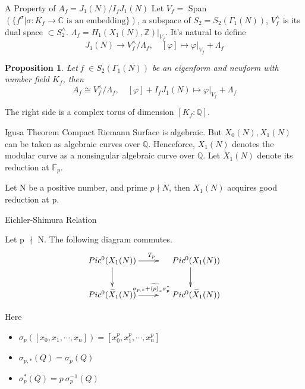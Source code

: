 \documentclass{beamer}
\theoremstyle{plain}
\newtheorem{proposition}{Proposition}[section]
\theoremstyle{definition}
\theoremstyle{remark}
\newcommand{\Q}{\mathbb{Q}}
\newcommand{\Z}{\mathbb{Z}}
\begin{document}
\begin{frame}{A Property of $A_f=J_1(N)/I_fJ_1(N)$}
    Let $V_f= $ Span $(\{f^{\sigma}|\sigma: K_f \to \mathbb{C} \text{ is an embedding}\})$, a subspace of $S_2=S_2(\Gamma_1(N))$,
    $V_f^{\wedge}$ is its dual space $\subset S_2^{\wedge}$. $\Lambda_f=H_1(X_1(N),\Z)|_{V_f}$. It's natural to define
    \[J_1(N) \to V_f^{\wedge}/\Lambda_f, \quad [\varphi] \mapsto \varphi|_{V_f} +\Lambda_f \]
    \pause
    \begin{proposition}
        Let f $\in S_2(\Gamma_1(N))$ be an eigenform and newform with number field $K_f$, then
        \[A_f \cong V_f^{\wedge}/\Lambda_f, \quad [\varphi] + I_fJ_1(N) \mapsto \varphi|_{V_f} +\Lambda_f\]
    \end{proposition}
    The right side is a complex torus of dimension $[K_f:\Q]$.
\end{frame}

\begin{frame}{Igusa Theorem}
    Compact Riemann Surface is algebraic. But $X_0(N),X_1(N)$ can be taken as algebraic curves over $\Q$.
    \vskip 0.2cm
    Henceforce, $X_1(N)$ denotes the modular curve as a nonsingular algebraic curve over $\Q$.
    Let $\widetilde{X}_1(N)$ denote its reduction at $\mathbb{F}_p$.
    \begin{theorem}
        Let N be a positive number, and prime $p \nmid N$, then
        $X_1(N)$ acquires good reduction at p.
    \end{theorem}

\end{frame}

\begin{frame}{Eichler-Shimura Relation}
    \begin{theorem}
        Let p $\nmid $ N. The following diagram commutes.
        \[\xymatrix{\ar @{} [dr] |{}
            Pic^0(X_1(N)) \ar[d] \ar[r]^{T_p} & \quad \ Pic^0(X_1(N)) \ar[d] \\
            Pic^0(\widetilde{X}_1(N)) \ar[r]^{\sigma_{p,*}+\widetilde{\langle p \rangle}_*\sigma^*_p} & \quad  \ Pic^0(\widetilde{X}_1(N)) } \]
    \end{theorem}
    Here
    \begin{itemize}
        \item $\sigma_p([x_0,x_1,\cdots,x_n])=[x_0^p,x_1^p,\cdots,x_n^p]$
        \item $\sigma_{p,*}(Q)= \sigma_p(Q)$
        \item $\sigma_p^*(Q)=p \  \sigma_p^{-1}(Q)$
    \end{itemize}

\end{frame}
\end{document}
